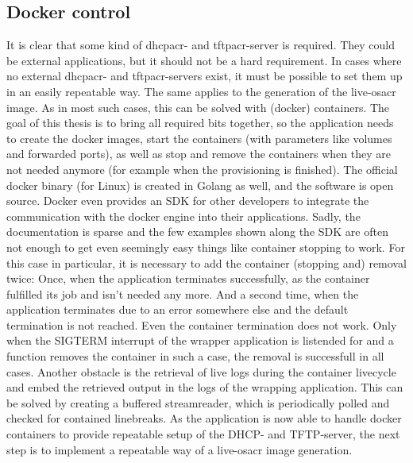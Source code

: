 \subsection{Docker control}
It is clear that some kind of \gls{dhcpacr}- and \gls{tftpacr}-server is required. They could be external applications, but it should not be a hard requirement. In cases where no external \gls{dhcpacr}- and \gls{tftpacr}-servers exist, it must be possible to set them up in an easily repeatable way. The same applies to the generation of the live-\gls{osacr} image. As in most such cases, this can be solved with (docker) containers. The goal of this thesis is to bring all required bits together, so the application needs to create the docker images, start the containers (with parameters like volumes and forwarded ports), as well as stop and remove the containers when they are not needed anymore (for example when the provisioning is finished).
\newline
The official docker binary (for Linux) is created in Golang as well, and the software is open source. Docker even provides an SDK for other developers to integrate the communication with the docker engine into their applications.
Sadly, the documentation is sparse and the few examples shown along the SDK are often not enough to get even seemingly easy things like container stopping to work. For this case in particular, it is necessary to add the container (stopping and) removal twice: Once, when the application terminates successfully, as the container fulfilled its job and isn't needed any more. And a second time, when the application terminates due to an error somewhere else and the default termination is not reached. Even  the container termination does not work. Only when the SIGTERM interrupt of the wrapper application is  listended for and a function removes the container in such a case, the removal is successfull in all cases.
\newline
Another obstacle is the retrieval of live logs during the container livecycle and embed the retrieved output in the logs of the wrapping application. This can be solved by creating a buffered streamreader, which is periodically polled and checked for contained linebreaks.
\newline
As the application is now able to handle docker containers to provide repeatable setup of the DHCP- and TFTP-server, the next step is to implement a repeatable way of a live-\gls{osacr} image generation.

